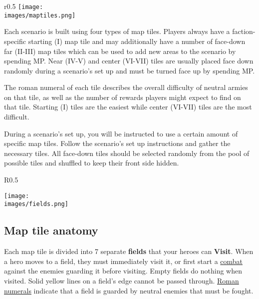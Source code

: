 
\begin{wrapfigure}{r}{0.5\textwidth}
  \texttt{[image: \\images/maptiles.png]}
\end{wrapfigure}
Each scenario is built using four types of map tiles.
Players always have a faction-specific starting (I) map tile and may additionally have a number of face-down far (II-III) map tiles which can be used to add new areas to the scenario by spending MP.
Near (IV-V) and center (VI-VII) tiles are usually placed face down randomly during a scenario’s set up and must be turned face up by spending MP.\par
The roman numeral of each tile describes the overall difficulty of neutral armies on that tile, as well as the number of rewards players might expect to find on that tile.
Starting (I) tiles are the easiest while center (VI-VII) tiles are the most difficult.\par
During a scenario’s set up, you will be instructed to use a certain amount of specific map tiles.
Follow the scenario’s set up instructions and gather the necessary tiles.
All face-down tiles should be selected randomly from the pool of possible tiles and shuffled to keep their front side hidden.\par

\begin{wrapfigure}{R}{0.5\textwidth}
  \begin{center}
  \texttt{[image: \\images/fields.png]}
  \end{center}
\end{wrapfigure}
\subsection*{Map tile anatomy}
Each map tile is divided into 7 separate \textbf{fields} that your heroes can \textbf{Visit}.
When a hero moves to a field, they must immediately visit it, or
first start a \hyperlink{Combat}{combat} against the enemies guarding it before visiting.
Empty fields do nothing when visited.
Solid yellow lines on a field's edge cannot be passed through.
\hyperlink{Difficulty}{Roman numerals} indicate that a field is guarded by neutral enemies that must be fought.\par

\clearpage

